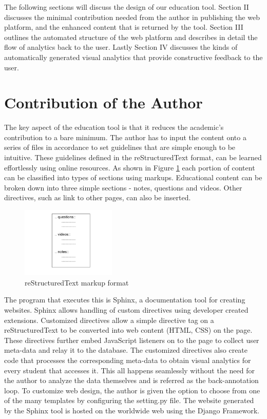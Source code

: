 \documentclass[a4paper, 11pt, conference]{ieeeconf}
\begin{document}
The following sections will discuss the design of our education tool. Section II discusses the minimal contribution needed from the author in publishing the web platform, and the enhanced content that is returned by the tool. Section III outlines the automated structure of the web platform and describes in detail the flow of analytics back to the user. Lastly Section IV discusses the kinds of automatically generated visual analytics that provide constructive feedback to the user.

\section{Contribution of the Author}
The key aspect of the education tool is that it reduces the academic's contribution to a bare minimum. 
The author has to input the content onto a series of files in accordance to set guidelines that are simple enough to be intuitive. These guidelines defined in the reStructuredText format, can be learned effortlessly using online resources. As shown in Figure \ref{fig:rst} each portion of content can be classified into types of sections using markups. Educational content can be broken down into three simple sections - notes, questions and videos. Other directives, such as link to other pages, can also be inserted.

\begin{figure}
\centering
\includegraphics[width=0.4\textwidth]{rst.png}
\caption{\label{fig:rst}reStructuredText markup format}
\end{figure}

The program that executes this is Sphinx, a documentation tool for creating websites. Sphinx allows handling of custom directives using developer created extensions. Customized directives allow a simple directive tag on a reStructuredText to be converted into web content (HTML, CSS) on the page. These directives further embed JavaScript listeners on to the page to collect user meta-data and relay it to the database. The customized directives also create code that processes the corresponding meta-data to obtain visual analytics for every student that accesses it. This all happens seamlessly without the need for the author to analyze the data themselves and is referred as the back-annotation loop. To customize web design, the author is given the option to choose from one of the many templates by configuring the setting.py file. The website generated by the Sphinx tool is hosted on the worldwide web using the Django Framework.
\end{document}
